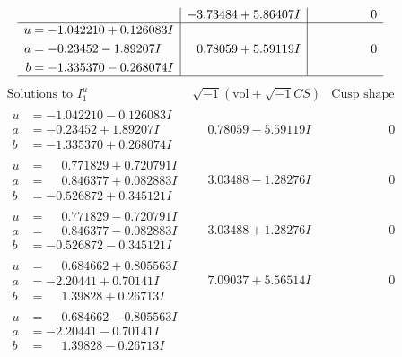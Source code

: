 \documentclass[1p]{elsarticle_modified}
\theoremstyle{definition}
\newcommand{\I}{\sqrt{-1}}
\begin{document}
$$\begin{array}{c|c|c}
 & -3.73484 + 5.86407 I & \phantom{-0.000000 } 0 \\ \hline\begin{aligned}
u &= -1.042210 + 0.126083 I \\
a &= -0.23452 - 1.89207 I \\
b &= -1.335370 - 0.268074 I\end{aligned}
 & \phantom{-}0.78059 + 5.59119 I & \phantom{-0.000000 } 0\\
 \hline 
 \end{array}$$\newpage$$\begin{array}{c|c|c}  
\text{Solutions to }I^u_{1}& \I (\text{vol} + \sqrt{-1}CS) & \text{Cusp shape}\\
 \hline 
\begin{aligned}
u &= -1.042210 - 0.126083 I \\
a &= -0.23452 + 1.89207 I \\
b &= -1.335370 + 0.268074 I\end{aligned}
 & \phantom{-}0.78059 - 5.59119 I & \phantom{-0.000000 } 0 \\ \hline\begin{aligned}
u &= \phantom{-}0.771829 + 0.720791 I \\
a &= \phantom{-}0.846377 + 0.082883 I \\
b &= -0.526872 + 0.345121 I\end{aligned}
 & \phantom{-}3.03488 - 1.28276 I & \phantom{-0.000000 } 0 \\ \hline\begin{aligned}
u &= \phantom{-}0.771829 - 0.720791 I \\
a &= \phantom{-}0.846377 - 0.082883 I \\
b &= -0.526872 - 0.345121 I\end{aligned}
 & \phantom{-}3.03488 + 1.28276 I & \phantom{-0.000000 } 0 \\ \hline\begin{aligned}
u &= \phantom{-}0.684662 + 0.805563 I \\
a &= -2.20441 + 0.70141 I \\
b &= \phantom{-}1.39828 + 0.26713 I\end{aligned}
 & \phantom{-}7.09037 + 5.56514 I & \phantom{-0.000000 } 0 \\ \hline\begin{aligned}
u &= \phantom{-}0.684662 - 0.805563 I \\
a &= -2.20441 - 0.70141 I \\
b &= \phantom{-}1.39828 - 0.26713 I\end{aligned}

\end{array}$$
\end{document}
